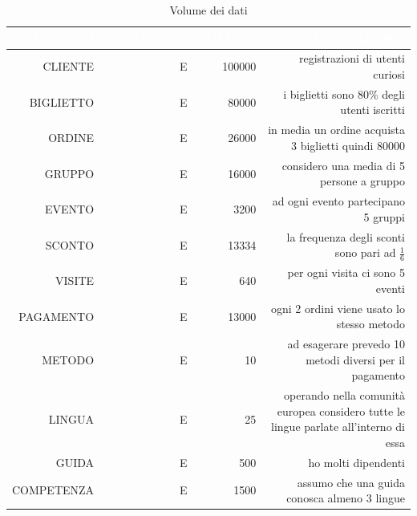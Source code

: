 \documentclass[a4paper,12pt]{report}
\begin{document}
\begin{xltabular}{\textwidth}{|D|D|D|D|}
    \caption{Volume dei dati} \label{tab:volumeDati}\\
    \hline
     \textcolor{white}{\uppercase{concetto}} & \textcolor{white}{\uppercase{costrutto}} & \textcolor{white}{\uppercase{volume}} & \textcolor{white}{\uppercase{descrizione}} \\
    \hline
    \endhead
    \uppercase{cliente}                 & \uppercase{e}         & 100000             & registrazioni di utenti curiosi                                                       \\
    \hline
    \uppercase{biglietto}               & \uppercase{e}         & 80000              & i biglietti sono 80\% degli utenti iscritti                                           \\
    \hline
    \uppercase{ordine}                  & \uppercase{e}         & 26000              & in media un ordine acquista 3 biglietti quindi 80000                                  \\
    \hline
    \uppercase{gruppo}                  & \uppercase{e}         & 16000              & considero una media di 5 persone a gruppo                                             \\
    \hline
    \uppercase{evento}                  & \uppercase{e}         & 3200               & ad ogni evento partecipano 5 gruppi                                                   \\
    \hline
    \uppercase{sconto}                  & \uppercase{e}         & 13334              & la frequenza degli sconti sono pari ad \(\frac16\)                                    \\
    \hline
    \uppercase{visite}                  & \uppercase{e}         & 640                & per ogni visita ci sono 5 eventi                                                      \\
    \hline
    \uppercase{pagamento}               & \uppercase{e}         & 13000              & ogni 2 ordini viene usato lo stesso metodo                                            \\
    \hline
    \uppercase{metodo}                  & \uppercase{e}         & 10                 & ad esagerare prevedo 10 metodi diversi per il pagamento                               \\
    \hline
    \uppercase{lingua}                  & \uppercase{e}         & 25                 & operando nella comunità europea considero tutte le lingue parlate all'interno di essa \\
    \hline
    \uppercase{guida}                  & \uppercase{e}         & 500                & ho molti dipendenti \\
    \hline
    \uppercase{competenza}             & \uppercase{e}         & 1500                & assumo che una guida conosca almeno 3 lingue \\
    \hline
\end{xltabular}
\end{document}
